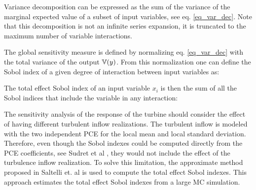 \documentclass[preprint,12pt]{elsarticle}
\begin{document}
Variance decomposition can be expressed as the sum of the variance of the marginal expected value of a subset of input variables, see eq. \ref{eq_var_dec}. Note that this decomposition is not an infinite series expansion, it is truncated to the maximum number of variable interactions.


The global sensitivity measure is defined by normalizing eq. \ref{eq_var_dec} with the total variance of the output $\mathbb{V}(y)$. From this normalization one can define the Sobol index of a given degree of interaction between input variables as:


The total effect Sobol index of an input variable $x_i$ is then the sum of all the Sobol indices that include the variable in any interaction:


The sensitivity analysis of the response of the turbine should consider the effect of having different turbulent inflow realizations. The turbulent inflow is modeled with the two independent PCE for the local mean and local standard deviation. Therefore, even though the Sobol indexes could be computed directly from the PCE coefficients, see Sudret et al \cite{sudret2008global}, they would not include the effect of the turbulence inflow realization. To solve this limitation, the approximate method proposed in Saltelli et. al \cite{saltelli2010variance} is used to compute the total effect Sobol indexes. This approach estimates the total effect Sobol indexes from a large MC simulation.
\end{document}
